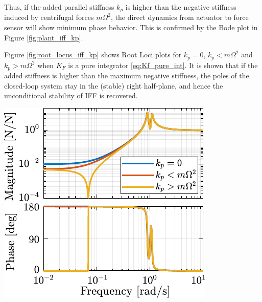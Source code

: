 \documentclass{ISMA_USD2020}
\begin{document}
Thus, if the added parallel stiffness \(k_p\) is higher than the negative stiffness induced by centrifugal forces \(m \Omega^2\), the direct dynamics from actuator to force sensor will show minimum phase behavior.
This is confirmed by the Bode plot in Figure \ref{fig:plant_iff_kp}.

Figure \ref{fig:root_locus_iff_kp} shows Root Loci plots for \(k_p = 0\), \(k_p < m \Omega^2\) and \(k_p > m \Omega^2\) when \(K_F\) is a pure integrator \eqref{eq:Kf_pure_int}.
It is shown that if the added stiffness is higher than the maximum negative stiffness, the poles of the closed-loop system stay in the (stable) right half-plane, and hence the unconditional stability of IFF is recovered.

\begin{minipage}[b]{0.42\linewidth}
\begin{center}
\includegraphics[scale=1]{figs/plant_iff_kp.pdf}
\end{center}
\end{minipage}
\hfill
\end{document}
